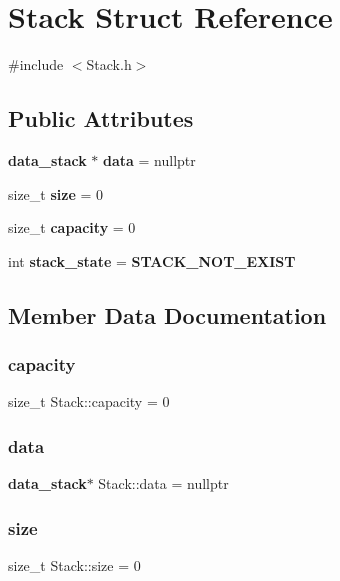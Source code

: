 \section{Stack Struct Reference}
\label{struct_stack}


{\ttfamily \#include $<$Stack.\+h$>$}

\subsection*{Public Attributes}
\begin{DoxyCompactItemize}
\item 
\textbf{ data\+\_\+stack} $\ast$ \textbf{ data} = nullptr
\item 
size\+\_\+t \textbf{ size} = 0
\item 
size\+\_\+t \textbf{ capacity} = 0
\item 
int \textbf{ stack\+\_\+state} = \textbf{ S\+T\+A\+C\+K\+\_\+\+N\+O\+T\+\_\+\+E\+X\+I\+ST}
\end{DoxyCompactItemize}


\subsection{Member Data Documentation}
\mbox{\label{struct_stack_afb6d4ad9d2904c20d50102d310c963e0}} 
\subsubsection{capacity}
{\footnotesize\ttfamily size\+\_\+t Stack\+::capacity = 0}

\mbox{\label{struct_stack_a3106563f8f21938dc9c387399b0cfdae}} 
\subsubsection{data}
{\footnotesize\ttfamily \textbf{ data\+\_\+stack}$\ast$ Stack\+::data = nullptr}

\mbox{\label{struct_stack_a3a469595caaaf49bbce059efabbe07b5}} 
\subsubsection{size}
{\footnotesize\ttfamily size\+\_\+t Stack\+::size = 0}

\mbox{\label{struct_stack_afd692b23b3475f3a415a419fce108d6a}} 

